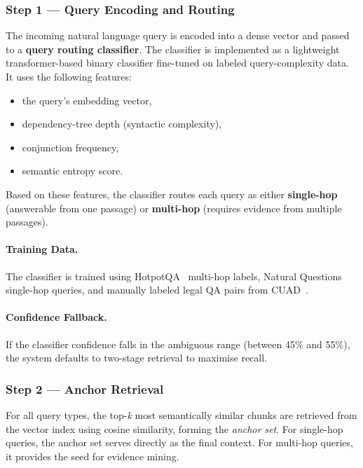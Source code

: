 \documentclass[12pt,a4paper]{article}
\begin{document}
\subsubsection{Step 1 --- Query Encoding and Routing}

The incoming natural language query is encoded into a dense vector and
passed to a \textbf{query routing classifier}. The classifier is implemented
as a lightweight transformer-based binary classifier fine-tuned on labeled
query-complexity data. It uses the following features:
\begin{itemize}
  \item the query's embedding vector,
  \item dependency-tree depth (syntactic complexity),
  \item conjunction frequency,
  \item semantic entropy score.
\end{itemize}
Based on these features, the classifier routes each query as either
\textbf{single-hop} (answerable from one passage) or \textbf{multi-hop}
(requires evidence from multiple passages).

\paragraph{Training Data.}
The classifier is trained using HotpotQA~\cite{yang2018hotpotqa} multi-hop
labels, Natural Questions~\cite{kwiatkowski2019nq} single-hop queries, and
manually labeled legal QA pairs from CUAD~\cite{hendrycks2021cuad}.

\paragraph{Confidence Fallback.}
If the classifier confidence falls in the ambiguous range (between 45\% and
55\%), the system defaults to two-stage retrieval to maximise recall.

\subsubsection{Step 2 --- Anchor Retrieval}

For all query types, the top-\textit{k} most semantically similar chunks are
retrieved from the vector index using cosine similarity, forming the
\emph{anchor set}. For single-hop queries, the anchor set serves directly as
the final context. For multi-hop queries, it provides the seed for evidence
mining.
\end{document}
